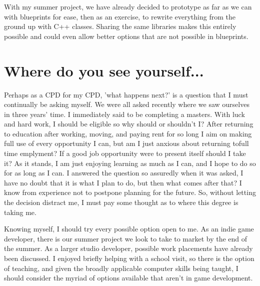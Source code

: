 \documentclass{scrartcl}
\begin{document}
With my summer project, we have already decided to prototype as far as we can with blueprints for ease, then as an exercise, to rewrite everything from the ground up with C++ classes.  Sharing the same libraries makes this entirely possible and could even allow better options that are not possible in blueprints.

\section*{Where do you see yourself...}

Perhaps as a CPD for my CPD, 'what happens next?' is a question that I must continually be asking myself.  We were all asked recently where we saw ourselves in three years' time.  I immediately said to be completing a masters.  With luck and hard work, I should be eligible so why should or shouldn't I?  After returning to education after working, moving, and paying rent for so long I aim on making full use of every opportunity I can, but am I just anxious about returning tofull time emplyment?  If a good job opportunity were to present itself should I take it?  As it stands, I am just enjoying learning as much as I can, and I hope to do so for as long as I can.  I answered the question so assuredly when it was asked, I have no doubt that it is what I plan to do, but then what comes after that?  I know from experience not to postpone planning for the future.  So, without letting the decision distract me, I must pay some thought as to where this degree is taking me.

Knowing myself, I should try every possible option open to me.  As an indie game developer, there is our summer project we look to take to market by the end of the summer.  As a larger studio developer, possible work placements have already been discussed.  I enjoyed briefly helping with a school visit, so there is the option of teaching, and given the broadly applicable computer skills being taught, I should consider the myriad of options available that aren't in game development.
\end{document}
